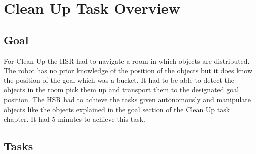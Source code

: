\documentclass[main.tex]{subfiles}
\begin{document}
	\begingroup

	\renewcommand{\cleardoublepage}{}

	\renewcommand{\clearpage}{}

	\chapter{Clean Up Task Overview}

		
		\section{Goal}
		For Clean Up the HSR had to navigate a room in which objects are distributed. The robot has no prior knowledge of the position of the objects but it does know the position of the goal which was a bucket. It had to be able to detect the objects in the room pick them up and transport them to the designated goal position. The HSR had to achieve the tasks given autonomously and manipulate objects like the objects explained in the goal section of the Clean Up task chapter. It had 5 minutes to achieve this task.
		

	  	\section{Tasks}
\end{document}

